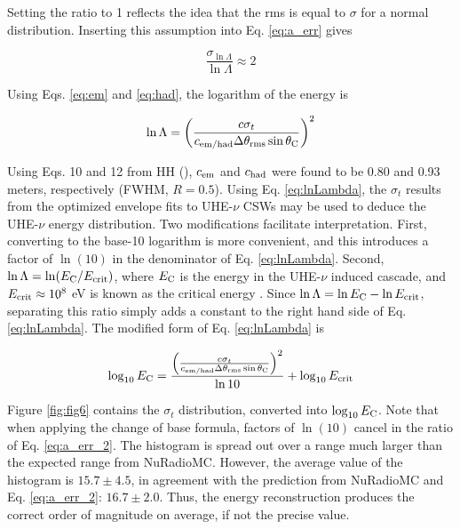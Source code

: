 \documentclass[amsmath,amssymb,aps,prd,10pt,twocolumn,showkeys]{revtex4}
\begin{document}
\begin{itemize}
Setting the ratio to 1 reflects the idea that the rms is equal to $\sigma$ for a normal distribution.  Inserting this assumption into Eq. \ref{eq:a_err} gives

\begin{equation}
\frac{\sigma_{\ln\Lambda}}{\ln\Lambda} \approx 2 \label{eq:a_err_2}
\end{equation}

Using Eqs. \ref{eq:em} and \ref{eq:had}, the logarithm of the energy is

\begin{equation}
\ln\Lambda = \left( \frac{c\sigma_t}{c_{\rm em/had} \Delta\theta_{\rm rms}\sin\theta_{\rm C}} \right)^2 \label{eq:lnLambda}
\end{equation}

Using Eqs. 10 and 12 from HH (\cite{PhysRevD.105.123019}), $c_{\rm em}$ and $c_{\rm had}$ were found to be 0.80 and 0.93 meters, respectively (FWHM, $R=0.5$).  Using Eq. \ref{eq:lnLambda}, the $\sigma_t$ results from the optimized envelope fits to UHE-$\nu$ CSWs may be used to deduce the UHE-$\nu$ energy distribution.  Two modifications facilitate interpretation.  First, converting to the base-10 logarithm is more convenient, and this introduces a factor of $\ln(10)$ in the denominator of Eq. \ref{eq:lnLambda}.  Second, $\ln\Lambda = \ln(E_{\rm C}/E_{\rm crit})$, where $E_{\rm C}$ is the energy in the UHE-$\nu$ induced cascade, and $E_{\rm crit}\approx 10^8$ eV is known as the critical energy \cite{PhysRevD.105.123019}.  Since $\ln\Lambda = \ln E_{\rm C} - \ln E_{\rm crit}$, separating this ratio simply adds a constant to the right hand side of Eq. \ref{eq:lnLambda}.  The modified form of Eq. \ref{eq:lnLambda} is

\begin{equation}
\log_{10} E_{\rm C} = \frac{\left( \frac{c\sigma_t}{c_{\rm em/had} \Delta\theta_{\rm rms}\sin\theta_{\rm C}} \right)^2}{\ln 10} + \log_{10} E_{\rm crit} \label{eq:lnLambda_2}
\end{equation}

Figure \ref{fig:fig6} contains the $\sigma_t$ distribution, converted into $\log_{10} E_{\rm C}$.  Note that when applying the change of base formula, factors of $\ln(10)$ cancel in the ratio of Eq. \ref{eq:a_err_2}.  The histogram is spread out over a range much larger than the expected range from NuRadioMC.  However, the average value of the histogram is $15.7 \pm 4.5$, in agreement with the prediction from NuRadioMC and Eq. \ref{eq:a_err_2}: $16.7 \pm 2.0$.  Thus, the energy reconstruction produces the correct order of magnitude on average, if not the precise value.


\end{itemize}
\end{document}
